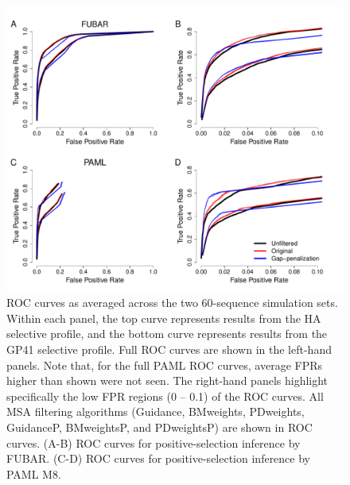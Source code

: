 \documentclass[11pt]{article}
\begin{document}
\bigskip

\begin{figure}[H]
\centerline{\includegraphics[width=6in]{Figures/ROC_prk.pdf}}
\caption{\label{roc} ROC curves as averaged across the two 60-sequence simulation sets. Within each panel, the top curve represents results from the HA selective profile, and the bottom curve represents results from the GP41 selective profile. Full ROC curves are shown in the left-hand panels. Note that, for the full PAML ROC curves, average FPRs higher than shown were not seen. The right-hand panels highlight specifically the low FPR regions (0 -- 0.1) of the ROC curves. All MSA filtering algorithms (Guidance, BMweights, PDweights, GuidanceP, BMweightsP, and PDweightsP) are shown in ROC curves. (A-B) ROC curves for positive-selection inference by FUBAR. (C-D) ROC curves for positive-selection inference by PAML M8.}
\end{figure}
\end{document}
